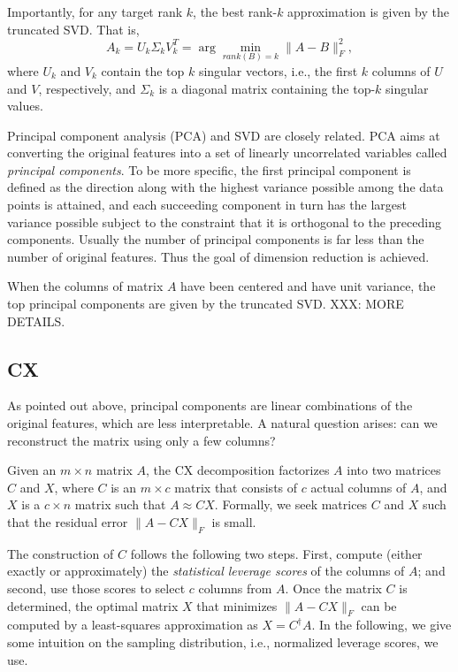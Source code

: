 
Importantly, for any target rank $k$, the best rank-$k$ approximation is given by the truncated SVD. That is,
  \begin{equation}
     A_k = U_k \Sigma_k V_k^T = \arg\min_{rank(B) = k} \|A - B\|_F^2,
  \end{equation}
where $U_k$ and $V_k$ contain the top $k$ singular vectors, i.e., the first $k$ columns of $U$ and $V$, respectively, and $\Sigma_k$ is a diagonal matrix containing the top-$k$ singular values.

Principal component analysis (PCA) and SVD are closely related.
PCA aims at converting the original features into a set of linearly uncorrelated variables called {\it principal components}.
To be more specific, the first principal component is defined as the direction along with the highest variance possible among the data points is attained, and each succeeding component in turn has the largest variance possible subject to the constraint that it is orthogonal to the preceding components.
Usually the number of principal components is far less than the number of original features. Thus the goal of dimension reduction is achieved.

When the columns of matrix $A$ have been centered and have unit variance, the top principal components are given by the truncated SVD.
XXX: MORE DETAILS.

\subsection{CX}
As pointed out above, principal components are linear combinations of the original features, which are less interpretable. A natural question arises: can we reconstruct the matrix using only a few columns?

Given an $m \times n$ matrix $A$, the CX decomposition factorizes $A$ into two matrices $C$ and $X$, where $C$ is an $m\times c$ matrix that consists of $c$ actual columns
of $A$, and $X$ is a $c \times n$ matrix such that $A\approx CX$.
Formally, we seek matrices $C$ and $X$ such that the residual error $\|A-CX\|_F$ is small.

The construction of $C$ follows the following two steps. First, compute (either exactly or approximately) the {\it statistical leverage scores} of the columns of $A$;
and second, use those scores to select $c$ columns from $A$.
Once the matrix $C$ is determined, the optimal matrix $X$ that minimizes $\|A-CX\|_F$ can be computed by a least-squares approximation as $X=C^\dagger A$.
In the following, we give some intuition on the sampling distribution, i.e., normalized leverage scores, we use.

